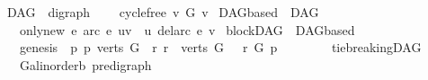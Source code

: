 \begin{isabellebody}
{\isafoldproof}%
%
\isadelimproof
%
\endisadelimproof
%
\isadelimdocument
%
\endisadelimdocument
%
\isatagdocument
%
\isamarkuptrue%
%
\isamarkuptrue%
%
\isamarkuptrue%
%
\endisatagdocument
{\isafolddocument}%
%
\isadelimdocument
%
\endisadelimdocument
{}\isamarkupfalse%
\ DAG\ {\isacharequal}{\kern0pt}\ digraph\ {\isacharplus}{\kern0pt}\isanewline
\ \ \ cycle{\isacharunderscore}{\kern0pt}free{\isacharcolon}{\kern0pt}\ {\isachardoublequoteopen}{\isasymnot}{\isacharparenleft}{\kern0pt}v\ {\isasymrightarrow}\isactrlsup {\isacharplus}{\kern0pt}\isactrlbsub G\isactrlesub \ v{\isacharparenright}{\kern0pt}{\isachardoublequoteclose}\isanewline
\isanewline
{}\isamarkupfalse%
\ DAGbased\ {\isacharequal}{\kern0pt}\ DAG\ {\isacharplus}{\kern0pt}\ \isanewline
\ \ \ only{\isacharunderscore}{\kern0pt}new{\isacharcolon}{\kern0pt}\ {\isachardoublequoteopen}{\isasymforall}e{\isachardot}{\kern0pt}\ arc\ e\ {\isacharparenleft}{\kern0pt}u{\isacharcomma}{\kern0pt}v{\isacharparenright}{\kern0pt}\ {\isasymlongrightarrow}\ {\isasymnot}{\isacharparenleft}{\kern0pt}u\ {\isasymrightarrow}\isactrlsup {\isacharasterisk}{\kern0pt}\isactrlbsub {\isacharparenleft}{\kern0pt}del{\isacharunderscore}{\kern0pt}arc\ e{\isacharparenright}{\kern0pt}\isactrlesub \ v{\isacharparenright}{\kern0pt}{\isachardoublequoteclose}\isanewline
\isanewline
{}\isamarkupfalse%
\ blockDAG\ {\isacharequal}{\kern0pt}\ DAGbased\ \ {\isacharplus}{\kern0pt}\isanewline
\ \ \ genesis{\isacharcolon}{\kern0pt}\ \ {\isachardoublequoteopen}{\isasymexists}p{\isachardot}{\kern0pt}\ {\isacharparenleft}{\kern0pt}p{\isasymin}\ verts\ G\ {\isasymand}\ {\isacharparenleft}{\kern0pt}{\isasymforall}r{\isachardot}{\kern0pt}\ r\ {\isasymin}\ verts\ G\ \ {\isasymlongrightarrow}\ r\ {\isasymrightarrow}\isactrlsup {\isacharasterisk}{\kern0pt}\isactrlbsub G\isactrlesub \ p{\isacharparenright}{\kern0pt}{\isacharparenright}{\kern0pt}{\isachardoublequoteclose}\ \ \ \ \ \ \ \isanewline
\isanewline
{}\isamarkupfalse%
\ tie{\isacharunderscore}{\kern0pt}breakingDAG\ {\isacharequal}{\kern0pt}\ \isanewline
\ \ \ G{\isacharcolon}{\kern0pt}{\isacharcolon}{\kern0pt}{\isachardoublequoteopen}{\isacharparenleft}{\kern0pt}{\isacharprime}{\kern0pt}a{\isacharcolon}{\kern0pt}{\isacharcolon}{\kern0pt}linorder{\isacharcomma}{\kern0pt}{\isacharprime}{\kern0pt}b{\isacharparenright}{\kern0pt}\ pre{\isacharunderscore}{\kern0pt}digraph{\isachardoublequoteclose}\isanewline

\end{isabellebody}
